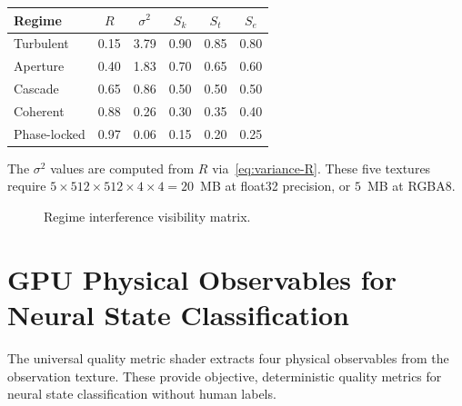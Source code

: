 \documentclass[11pt,twocolumn,a4paper]{article}
\newcommand{\Sk}{S_k}
\newcommand{\St}{S_t}
\newcommand{\Se}{S_e}
\begin{document}
\begin{center}
\begin{tabular}{lccccc}
\toprule
Regime & $R$ & $\sigma^2$ & $\Sk$ & $\St$ & $\Se$ \\
\midrule
Turbulent & 0.15 & 3.79 & 0.90 & 0.85 & 0.80 \\
Aperture & 0.40 & 1.83 & 0.70 & 0.65 & 0.60 \\
Cascade & 0.65 & 0.86 & 0.50 & 0.50 & 0.50 \\
Coherent & 0.88 & 0.26 & 0.30 & 0.35 & 0.40 \\
Phase-locked & 0.97 & 0.06 & 0.15 & 0.20 & 0.25 \\
\bottomrule
\end{tabular}
\end{center}

\noindent The $\sigma^2$ values are computed from $R$ via~\eqref{eq:variance-R}.
These five textures require $5 \times 512 \times 512 \times 4 \times 4 = 20$~MB at float32 precision, or $5$~MB at RGBA8.

\begin{figure}[t]
\centering
{}
\caption{Regime interference visibility matrix.}
\label{fig:visibility-matrix}
\end{figure}



\section{GPU Physical Observables for Neural State Classification}
\label{sec:observables}

The universal quality metric shader extracts four physical observables from the observation texture.
These provide objective, deterministic quality metrics for neural state classification without human labels.
\end{document}
